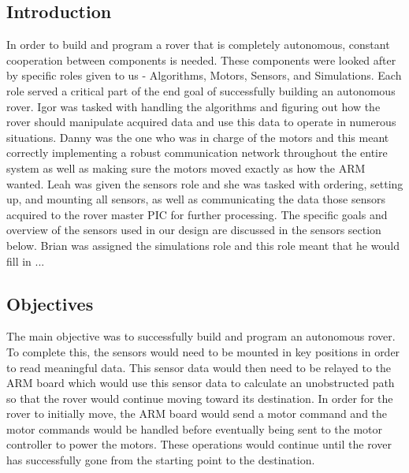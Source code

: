 





\usepackage[compact]{titlesec}





\subsection{Introduction}
In order to build and program a rover that is completely autonomous, constant cooperation between components is needed. These components were looked after by specific roles given to us - Algorithms, Motors, Sensors, and Simulations. Each role served a critical part of the end goal of successfully building an autonomous rover. Igor was tasked with handling the algorithms and figuring out how the rover should manipulate acquired data and use this data to operate in numerous situations. Danny was the one who was in charge of the motors and this meant correctly implementing a robust communication network throughout the entire system as well as making sure the motors moved exactly as how the ARM wanted. Leah was given the sensors role and she was tasked with ordering, setting up, and mounting all sensors, as well as communicating the data those sensors acquired to the rover master PIC for further processing.  The specific goals and overview of the sensors used in our design are discussed in the sensors section below.  Brian was assigned the simulations role and this role meant that he would fill in ...

\subsection{Objectives}
The main objective was to successfully build and program an autonomous rover. To complete this, the sensors would need to be mounted in key positions in order to read meaningful data. This sensor data would then need to be relayed to the ARM board which would use this sensor data to calculate an unobstructed path so that the rover would continue moving toward its destination. In order for the rover to initially move, the ARM board would send a motor command and the motor commands would be handled before eventually being sent to the motor controller to power the motors. These operations would continue until the rover has successfully gone from the starting point to the destination.

